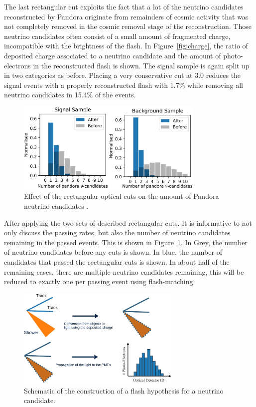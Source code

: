 \documentclass[a4paper]{article}
\begin{document}
The last rectangular cut exploits the fact that a lot of the neutrino candidates reconstructed by Pandora originate from remainders of cosmic activity that was not completely removed in the cosmic removal stage of the reconstruction. Those neutrino candidates often consist of a small amount of fragmented charge, incompatible with the brightness of the flash. In Figure~\ref{fig:charge}, the ratio of deposited charge associated to a neutrino candidate and the  amount of photo-electrons in the reconstructed flash is shown. The signal sample is again split up in two categories as before. Placing a very conservative cut at 3.0 reduces the signal events with a properly reconstructed flash with 1.7\% while removing all neutrino candidates in 15.4\% of the events. 

\begin{figure}[!htbp]
\centering
\includegraphics[width=0.8\textwidth]{boxed}
\caption{Effect of the rectangular optical cuts on the amount of Pandora neutrino candidates .} 
\label{fig:boxed}
\end{figure}

After applying the two sets of described rectangular cuts. It is informative to not only discuss the passing rates, but also the number of neutrino candidates remaining in the passed events. This is shown in Figure~\ref{fig:boxed}. In Grey, the number of neutrino candidates before any cuts is shown. In blue, the number of candidates that passed the rectangular cuts is shown. In about half of the remaining cases, there are multiple neutrino candidates remaining, this will be reduced to exactly one per passing event using flash-matching. 

\begin{figure}[!htbp]
\centering
\includegraphics[width=0.7\textwidth]{flashdrawing} 
\caption{Schematic of the construction of a flash hypothesis for a neutrino candidate.} 
\label{fig:flashdrawing}
\end{figure}
\end{document}
